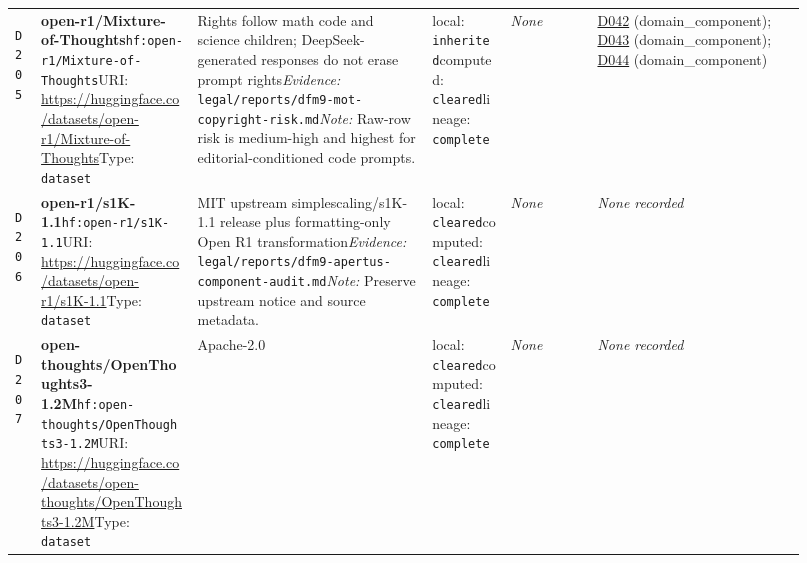 \documentclass[9pt,a4paper]{article}
\newcommand{\depid}[1]{\hypertarget{dep:#1}{\texttt{#1}}}
\begin{document}
\begin{landscape}
\begin{longtable}{@{}L{0.035\linewidth}L{0.185\linewidth}L{0.27\linewidth}L{0.09\linewidth}L{0.10\linewidth}L{0.24\linewidth}@{}}
\depid{D205} & \textbf{open-r1/Mixture-of-Thoughts}\newline \nolinkurl{hf:open-r1/Mixture-of-Thoughts}\newline URI: \url{https://huggingface.co/datasets/open-r1/Mixture-of-Thoughts}\newline Type: \texttt{dataset} & Rights follow math code and science children; DeepSeek-generated responses do not erase prompt rights\newline \textit{Evidence:} \nolinkurl{legal/reports/dfm9-mot-copyright-risk.md}\newline \textit{Note:} Raw-row risk is medium-high and highest for editorial-conditioned code prompts. & local: \texttt{inherited}\newline computed: \texttt{cleared}\newline lineage: \texttt{complete} & \textit{None} & \hyperlink{dep:D042}{D042} (domain\_component); \hyperlink{dep:D043}{D043} (domain\_component); \hyperlink{dep:D044}{D044} (domain\_component) \\
\depid{D206} & \textbf{open-r1/s1K-1.1}\newline \nolinkurl{hf:open-r1/s1K-1.1}\newline URI: \url{https://huggingface.co/datasets/open-r1/s1K-1.1}\newline Type: \texttt{dataset} & MIT upstream simplescaling/s1K-1.1 release plus formatting-only Open R1 transformation\newline \textit{Evidence:} \nolinkurl{legal/reports/dfm9-apertus-component-audit.md}\newline \textit{Note:} Preserve upstream notice and source metadata. & local: \texttt{cleared}\newline computed: \texttt{cleared}\newline lineage: \texttt{complete} & \textit{None} & \textit{None recorded} \\
\depid{D207} & \textbf{open-thoughts/OpenThoughts3-1.2M}\newline \nolinkurl{hf:open-thoughts/OpenThoughts3-1.2M}\newline URI: \url{https://huggingface.co/datasets/open-thoughts/OpenThoughts3-1.2M}\newline Type: \texttt{dataset} & Apache-2.0 & local: \texttt{cleared}\newline computed: \texttt{cleared}\newline lineage: \texttt{complete} & \textit{None} & \textit{None recorded} \\

\end{longtable}
\end{landscape}
\end{document}

